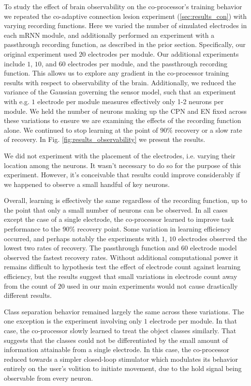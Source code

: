 \documentclass[12pt]{iopart}
\begin{document}
To study the effect of brain observability on the co-processor's training behavior
we repeated the co-adaptive connection lesion experiment (\ref{sec:results_con})
with varying recording functions. Here we varied the number of simulated electrodes
in each mRNN module, and additionally performed an experiment with a passthrough recording
function, as described in the prior section. Specifically, our original experiment used
$20$ electrodes per module. Our additional experiments include $1$, $10$, and $60$ electrodes
per module, and the passthrough recording function. This allows us to explore any
gradient in the co-processor training results with respect to observability of the 
brain. Additionally, we reduced the variance of the Gaussian governing
the sensor model, such that an experiment with e.g. $1$ electrode per
module measures effectively only 1-2 neurons per module. We held the number of
neurons making up the CPN and EN fixed across these variations to ensure we
are examining the effects of the recording function alone. We continued to stop
learning at the point of $90\%$ recovery or a slow rate of recovery. In Fig.
\ref{fig:results_observability} we present the results.

We did not experiment with the placement of the electrodes, i.e. varying their
location among the neurons. It wasn't necessary to do so for the purpose of this
experiment. However, it's conceivable that results could improve considerably if we
happened to observe a small handful of key neurons.

Overall, learning is effectively the same regardless of the recording 
function, up to the point that only a small number of neurons can be 
observed. In all cases except the 
case of a single electrode, the co-processor learned to improve task
performance to the $90\%$ recovery point. Some variation in learning
efficiency occurred, and perhaps notably the experiments with $1$, $10$
electrodes observed the lowest two rates of recovery. The passthrough 
function and $60$ electrode model observed the fastest recovery rates.
Without additional computational power it remains difficult to hypothesis
test the effect of electrode count against learning efficiency, but the
results suggest that small variations in electrode count away from the
count of $20$ used in our main experiments would not cause drastically
different results.

Class separation behavior remained largely the same across these variations. The one exception is the experiment
involving only $1$ electrode per module. In that case, the co-processor
slowly learned to treat the object classes similarly. That suggests that
the classes could not be differentiated by the small amount of information
attainable from a single electrode. In this case, the co-processor reduced
towards a simpler closed-loop stimulator which modulates its behavior
entirely on the user's volition to initiate movement, due to the hold
signal being observable from every neuron.
\end{document}
